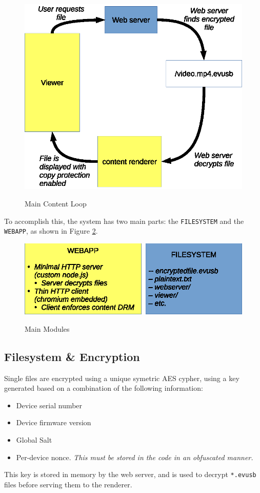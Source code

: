 \documentclass{article}
\begin{document}
\begin{figure}
\centering
\caption{Main Content Loop}
\includegraphics{contentloop.eps}
\label{fig:contentloop}
\end{figure}

To accomplish this, the system has two main parts: the \verb+FILESYSTEM+ 
and the \verb+WEBAPP+, as shown in Figure \ref{fig:mainmods}.

\begin{figure}
\centering
\caption{Main Modules}
\includegraphics{mainmods.eps}
\label{fig:mainmods}
\end{figure}

\subsection{Filesystem \& Encryption}
Single files are encrypted using a unique symetric AES cypher, using a
key generated based on a combination of the following information:
\begin{itemize}
\item Device serial number 
\item Device firmware version
\item Global Salt 
\item Per-device nonce.  \emph{This must be stored in the code in an
      obfuscated manner.}
\end{itemize}
This key is stored in memory by the web server, and is used to decrypt
\verb+*.evusb+ files before serving them to the renderer.
\end{document}
